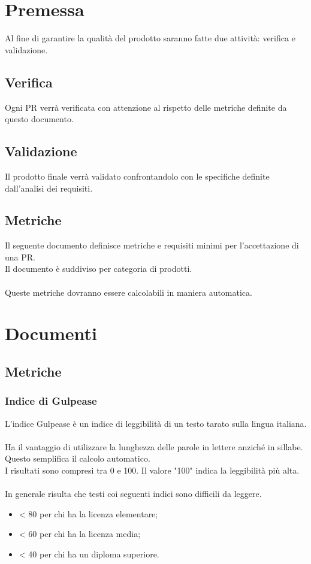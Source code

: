 \documentclass[a4paper, 12pt]{article}
\begin{document}
\makefrontpage

\makeversioni

\section{Premessa}
Al fine di garantire la qualità del prodotto saranno fatte due attività: verifica e validazione.
\subsection{Verifica}
Ogni PR verrà verificata con attenzione al rispetto delle metriche definite da questo documento.
\subsection{Validazione}
Il prodotto finale verrà validato confrontandolo con le specifiche definite dall'analisi dei requisiti.
\subsection{Metriche}
Il seguente documento definisce metriche e requisiti minimi per l'accettazione di una PR.\\
Il documento è suddiviso per categoria di prodotti.\\\\
Queste metriche dovranno essere calcolabili in maniera automatica.
\section{Documenti}
\subsection{Metriche}
\subsubsection{Indice di Gulpease}
L'indice Gulpease è un indice di leggibilità di un testo tarato sulla lingua italiana.\\\\
Ha il vantaggio di utilizzare la lunghezza delle parole in lettere anziché in sillabe.\\
Questo semplifica il calcolo automatico.\\
I risultati sono compresi tra 0 e 100. Il valore "100" indica la leggibilità più alta.\\\\
In generale risulta che testi coi seguenti indici sono difficili da leggere.
\begin{itemize}
    \item < 80 per chi ha la licenza elementare;
    \item < 60 per chi ha la licenza media;
    \item < 40 per chi ha un diploma superiore.
\end{itemize}
\end{document}
